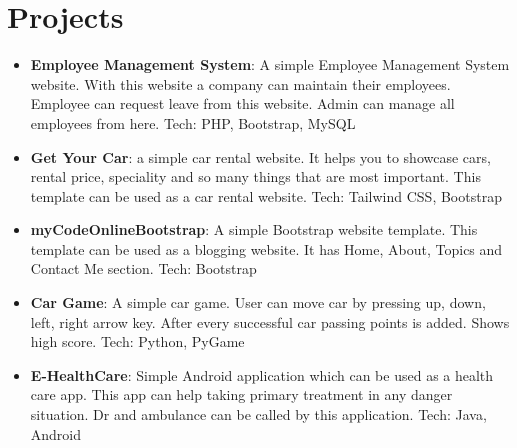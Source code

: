 \documentclass[a4paper,20pt]{article}
\newcommand{\resumeItem}[2]{
  \item\small{
    \textbf{#1}{: #2 \vspace{-2pt}}
  }
}
\newcommand{\resumeSubItem}[2]{\resumeItem{#1}{#2}\vspace{-3pt}}
\newcommand{\resumeSubHeadingListStart}{\begin{itemize}[leftmargin=*]}
\newcommand{\resumeSubHeadingListEnd}{\end{itemize}}
\begin{document}
\section{Projects}
\resumeSubHeadingListStart
\resumeSubItem{Employee Management System}{A simple Employee Management System website. With this website a company can maintain their employees. Employee can request leave from this website. Admin can manage all employees from here. 
\newline
Tech: PHP, Bootstrap, MySQL}

\vspace{2pt}

\resumeSubItem{Get Your Car}{a simple car rental website. It helps you to showcase cars, rental price, speciality and so many things that are most important. This template can be used as a car rental website. 
\newline
Tech: Tailwind CSS, Bootstrap}

\vspace{2pt}

\resumeSubItem{myCodeOnlineBootstrap}{A simple Bootstrap website template. This template can be used as a blogging website. It has Home, About, Topics and Contact Me section.
\newline
Tech: Bootstrap}

\vspace{2pt}

\resumeSubItem{Car Game}{A simple car game. User can move car by pressing up, down, left, right arrow key. After every successful car passing points is added. Shows high score. 
\newline
Tech: Python, PyGame}

\vspace{2pt}

\resumeSubItem{E-HealthCare}{Simple Android application which can be used as a health care app. This app can help taking primary treatment in any danger situation. Dr and ambulance can be called by this application. 
\newline
Tech: Java, Android}

\resumeSubHeadingListEnd

\vspace{5pt}

\end{document}
